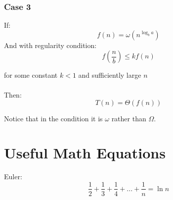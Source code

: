 \subsubsection*{Case 3}
If:
$$f(n) = \omega(n^{\log_b a})$$
And with regularity condition:
$$f(\frac{n}{b}) \le k f(n)$$

for some constant $k < 1$ and sufficiently large $n$\\\\
Then:
$$T\left(n \right) = \Theta\left(f(n) \right)$$

Notice that in the condition it is $\omega$ rather than $\Omega$. 

\section{Useful Math Equations}
Euler:
$$
\frac{1}{2}+\frac{1}{3}+\frac{1}{4} + ... + \frac{1}{n} = \ln{n}
$$
